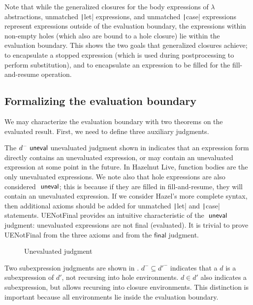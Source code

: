 Note that while the generalized closures for the body expressions of $\lambda$ abstractions, unmatched \texttt|let| expressions, and unmatched \texttt|case| expressions represent expressions outside of the evaluation boundary, the expressions within non-empty holes (which also are bound to a hole closure) lie within the evaluation boundary. This shows the two goals that generalized closures achieve; to encapsulate a stopped expression (which is used during postprocessing to perform substitution), and to encapsulate an expression to be filled for the fill-and-resume operation.

\subsection{Formalizing the evaluation boundary}
\label{sec:eval-boundary-metatheorem}

We may characterize the evaluation boundary with two theorems on the evaluated result. First, we need to define three auxiliary judgments.

The $d^-\textsf{ uneval}$ unevaluated judgment shown in  indicates that an expression form directly contains an unevaluated expression, or may contain an unevaluated expression at some point in the future. In Hazelnut Live, function bodies are the only unevaluated expressions. We note also that hole expressions are also considered $\textsf{ uneval}$; this is because if they are filled in fill-and-resume, they will contain an unevaluated expression. If we consider Hazel's more complete syntax, then additional axioms should be added for unmatched \texttt|let| and \texttt|case| statements. UENotFinal provides an intuitive characteristic of the $\textsf{ uneval}$ judgment: unevaluated expressions are not final (evaluated). It is trivial to prove UENotFinal from the three axioms and from the $\textsf{final}$ judgment.

\begin{figure}
  \centering
  \begin{mdframed}
    \begin{singlespace}
      
    \end{singlespace}
  \end{mdframed}
  \caption{Unevaluated judgment}
  \label{fig:uneval}
\end{figure}

Two subexpression judgments are shown in . $d^-\subseteq d'^-$ indicates that a $d$ is a subexpression of $d'$, not recursing into hole environments. $d\in d'$ also indicates a subexpression, but allows recursing into closure environments. This distinction is important because all environments lie inside the evaluation boundary.


